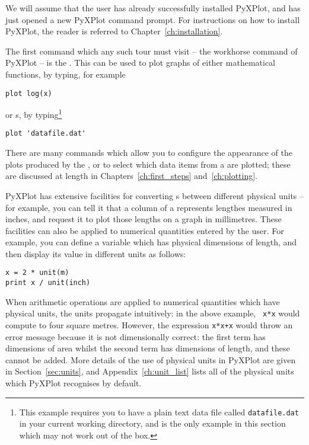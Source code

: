 We will assume that the user has already successfully installed PyXPlot, and
has just opened a new PyXPlot command prompt. For instructions on how to
install PyXPlot, the reader is referred to Chapter~\ref{ch:installation}.

The first command which any such tour must visit -- the workhorse command of
PyXPlot -- is the . This can be used to plot graphs of either
mathematical functions, by typing, for example

\begin{verbatim}
plot log(x)
\end{verbatim}

\noindent or \datafile s, by typing\footnote{This example requires you to have a
plain text data file called {\tt datafile.dat} in your current working directory,
and is the only example in this section which may not work out of the box.}

\begin{verbatim}
plot 'datafile.dat'
\end{verbatim}

\noindent There are many commands which allow you to configure the appearance
of the plots produced by the , or to select which data items from
a \datafile are plotted; these are discussed at length in
Chapters~\ref{ch:first_steps} and~\ref{ch:plotting}.

PyXPlot has extensive facilities for converting \datafile s between different
physical units -- for example, you can tell it that a column of a \datafile
represents lengthes measured in inches, and request it to plot those lengths on
a graph in millimetres. These facilities can also be applied to numerical
quantities entered by the user.  For example, you can define a variable which
has physical dimensions of length, and then display its value in different
units as follows:

\begin{verbatim}
x = 2 * unit(m)
print x / unit(inch)
\end{verbatim}

When arithmetic operations are applied to numerical quantities which have
physical units, the units propagate intuitively: in the above example, {\tt
x*x} would compute to four square metres. However, the expression {\tt x*x+x}
would throw an error message because it is not dimensionally correct: the first
term has dimensions of area whilst the second term has dimensions of length,
and these cannot be added.  More details of the use of physical units in
PyXPlot are given in Section~\ref{sec:units}, and Appendix~\ref{ch:unit_list}
lists all of the physical units which PyXPlot recognises by default.

